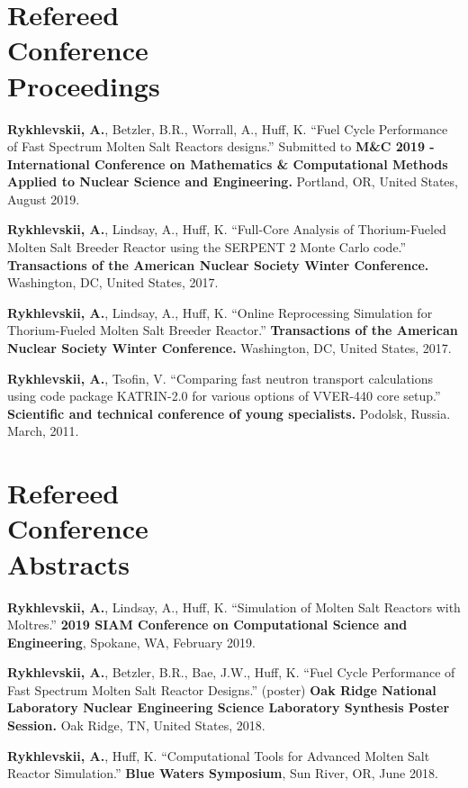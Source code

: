 \documentclass[margin,line]{resume}
\begin{document}
\begin{resume}
    \section{\mysidestyle Refereed\\Conference\\Proceedings}
    \begin{bibenum}
    \item \textbf{Rykhlevskii, A.}, Betzler, B.R., Worrall, A., Huff, K. ``Fuel Cycle Performance of Fast Spectrum Molten Salt Reactors designs.'' Submitted to \textbf{M\&C 2019 - International Conference on Mathematics \& Computational Methods Applied to Nuclear Science and Engineering.} 
            Portland, OR, United States, August 2019.    
    \item \textbf{Rykhlevskii, A.}, Lindsay, A., Huff, K. ``Full-Core Analysis of Thorium-Fueled Molten Salt Breeder Reactor using the SERPENT 2 Monte Carlo code.'' 
            \textbf{Transactions of the American Nuclear Society Winter Conference.} 
            Washington, DC, United States, 2017.
    \item \textbf{Rykhlevskii, A.}, Lindsay, A., Huff, K. ``Online Reprocessing Simulation for Thorium-Fueled Molten Salt Breeder Reactor.'' 
            \textbf{Transactions of the American Nuclear Society Winter Conference.} 
            Washington, DC, United States, 2017.
      \item \textbf{Rykhlevskii, A.}, Tsofin, V. ``Comparing fast neutron transport calculations using code package KATRIN-2.0 for various options of VVER-440 core setup.''
         \textbf{Scientific and technical conference of young specialists.}
         Podolsk, Russia. March, 2011.
	\end{bibenum}
    \section{\mysidestyle Refereed\\Conference\\Abstracts}
    \begin{bibenum} 
    \item \textbf{Rykhlevskii, A.}, Lindsay, A., Huff, K. ``Simulation of Molten Salt Reactors with Moltres.'' \textbf{2019 SIAM Conference on Computational Science and Engineering}, 
            Spokane, WA, February 2019.
	\item \textbf{Rykhlevskii, A.}, Betzler, B.R., Bae, J.W., Huff, K. ``Fuel Cycle Performance of Fast Spectrum Molten Salt Reactor Designs.'' (poster)
            \textbf{Oak Ridge National Laboratory Nuclear Engineering Science Laboratory Synthesis Poster Session.} 
            Oak Ridge, TN, United States, 2018.
    \item \textbf{Rykhlevskii, A.}, Huff, K. ``Computational Tools for Advanced 
            Molten Salt Reactor Simulation.'' \textbf{Blue Waters Symposium}, 
            Sun River, OR, June 2018.
	\end{bibenum}

\end{resume}
\end{document}
